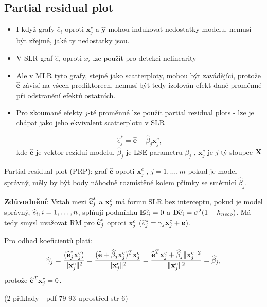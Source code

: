 \subsection{Partial residual plot}
\begin{itemize}
\item I když grafy $ \widehat{e}_i $ oproti $ \textbf{x}_j^c $ a $ \widehat{\textbf{y}} $ mohou indukovat nedostatky modelu, nemusí být zřejmé, jaké ty nedostatky jsou.
\item V SLR graf $ \widehat{e}_i $ oproti $ x_i $ lze použít pro detekci nelinearity
\item Ale v MLR tyto grafy, stejně jako scatterploty, mohou být zavádějící, protože $ \widehat{\textbf{e}} $ závisí na všech prediktorech, nemusí být tedy izolován efekt dané proměnné při odstranění efektů ostatních.
\item Pro zkoumané efekty $ j $-té proměnné lze použít partial rezidual plots - lze je chápat jako jeho ekvivalent scatterplotu v SLR

\begin{define}
 $$
   \widehat{e}_j^* = \widehat{\textbf{e}} + \widehat{\beta}_j \textbf{x}_j^c,
 $$
 kde $ \widehat{\textbf{e}} $ je vektor reziduí modelu, $ \widehat{\beta}_j $ je LSE parametru $ \beta_j $ , $ \textbf{x}_j^c $ je $ j $-tý sloupec $ \textbf{X} $
\end{define}
\end{itemize}
Partial residual plot (PRP): graf $ \widehat{\textbf{e}} $ oproti $ \textbf{x}_j^c $ , $ j = 1, \dots , m $ pokud je model správný, měly by být body náhodně rozmístěné kolem přímky se směrnicí $ \widehat{\beta}_j $.

\textbf{Zdůvodnění}: Vztah mezi $\widehat{\textbf{e}}_j^{*}$ a $\textbf{x}_j^c$ má formu SLR bez interceptu, pokud je model správný, $\widehat{e}_i, i = 1, \dots, n$, splňují podmínku $\mathbb{E} \widehat{e}_i = 0$ a $\mathrm{D} \widehat{e}_i = \sigma^2(1 - h_{neco})$. Má tedy smysl uvažovat RM pro $\widehat{\textbf{e}}_j^{*}$ oproti $\textbf{x}_j^c$ ($\widehat{e}_j^{*} = \gamma_j \textbf{x}_j^c + \textbf{e}$).

\newcommand{\hg}{\widehat{\gamma}}

Pro odhad koeficientů platí:
$$
\hg_j = \frac{(\heb_j^{*} \x_j^c)}{\norm{\x_j^c}^2} = \frac{(\heb + \wbeta_j \x_j^c)^T \x_j^c}{\norm{\x_j^c}^2} = \frac{\heb^T \x_j^c + \wbeta_j \norm{\x_j^c}^2}{\norm{\x_j^c}^2} = \wbeta_j,
$$
protože $\widehat{\textbf{e}}^T \textbf{x}_j^c = 0$.

(2 příklady - pdf 79-93 uprostřed str 6)

\newcommand{\wb}{\mathbf{w}}
\newcommand{\identita}{\mathbb{I}}
\newcommand{\Xmj}{\X_{(-j)}}
\newcommand{\Xmi}{\X_{(-i)}}

